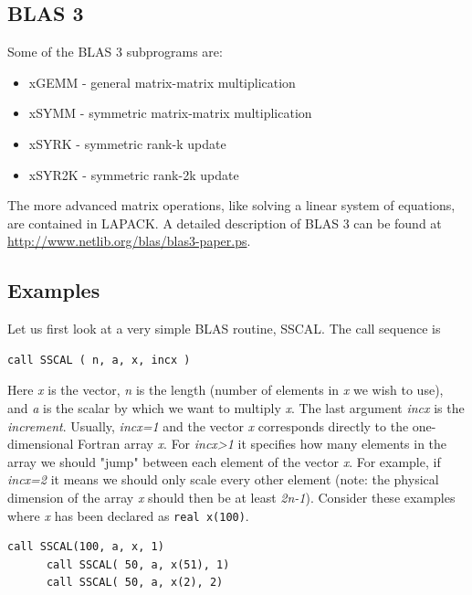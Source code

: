 \subsection{BLAS 3}

Some of the BLAS 3 subprograms are:

\begin{itemize}
    \item xGEMM - general matrix-matrix multiplication
    \item xSYMM - symmetric matrix-matrix multiplication
    \item xSYRK - symmetric rank-k update
    \item xSYR2K - symmetric rank-2k update
\end{itemize}

The more advanced matrix operations, like solving a linear system of equations, are contained in LAPACK. A detailed description of BLAS 3 can be found at \url{http://www.netlib.org/blas/blas3-paper.ps}.

\subsection{Examples}

Let us first look at a very simple BLAS routine, SSCAL. The call sequence is

\begin{lstlisting}[style=fortran77]
      call SSCAL ( n, a, x, incx )
\end{lstlisting}

Here \emph{x} is the vector, \emph{n} is the length (number of elements in \emph{x} we wish to use), and \emph{a} is the scalar by which we want to multiply \emph{x}. The last argument \emph{incx} is the \emph{increment}. Usually, \emph{incx=1} and the vector \emph{x} corresponds directly to the one-dimensional Fortran array \emph{x}. For \emph{incx>1} it specifies how many elements in the array we should "jump" between each element of the vector \emph{x}. For example, if \emph{incx=2} it means we should only scale every other element (note: the physical dimension of the array \emph{x} should then be at least \emph{2n-1}). Consider these examples where \emph{x} has been declared as \texttt{real x(100)}.

\begin{lstlisting}[style=fortran77]
      call SSCAL(100, a, x, 1)
      call SSCAL( 50, a, x(51), 1)
      call SSCAL( 50, a, x(2), 2)
\end{lstlisting}

